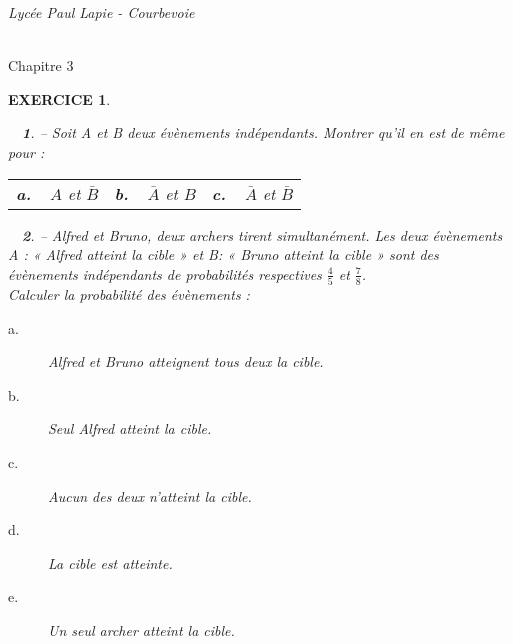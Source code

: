 \documentclass[a4paper]{article}   %
\renewcommand{\(}{\left(}
\renewcommand{\)}{\right)}
\newtheorem{ques}{~}
\newenvironment{qu}{\begin{ques}--} {\end{ques}}
\newtheorem{EXO}{\large EXERCICE }
\newenvironment{EX}   { \setcounter{ques}{0} \begin{EXO} \hrulefill ~\vspace{0.3cm}

\normalfont}    {\end{EXO} \medskip}
\def\cl{{\large \bf{1èreG1}}}
\begin{document}
\newpage \setcounter{EXO}{0}

\noindent\begin{minipage}{.20\linewidth}\begin{center}                  
\noindent \emph{Lycée Paul Lapie - Courbevoie}
\end{center}\end{minipage}
\begin{minipage}{1.5\linewidth}\begin{center}	
\noindent \cl\\ Chapitre 3
\end{center}\end{minipage}

\begin{center} 	
\end{center}
\begin{EX}
\begin{qu}
Soit A et B deux évènements indépendants. Montrer qu’il en est de même pour :
\begin{center}\begin{tabular}{p{4cm} p{4cm}p{4cm}}
\textbf{a.~~}$A$ et $\bar{B}$&\textbf{b.~~}$\bar{A}$ et $B$&\textbf{c.~~}$\bar{A}$ et $\bar{B}$\\
\end{tabular}\end{center}
\end{qu}
\begin{qu}
Alfred et Bruno, deux archers tirent simultanément. Les deux évènements A : « Alfred atteint la cible » et B: « Bruno atteint la cible » sont des évènements indépendants de probabilités respectives $\displaystyle \frac{4}{5}$ et $\displaystyle \frac{7}{8}$. \\
Calculer la probabilité des évènements :
\begin{description}
\item [a.] Alfred et Bruno atteignent tous deux la cible.
\item [b.] Seul Alfred atteint la cible.
\item [c.] Aucun des deux n'atteint la cible.
\item [d.] La cible est atteinte.
\item [e.] Un seul archer atteint la cible.
\end{description}
\end{qu}

\end{EX}
\end{document}
